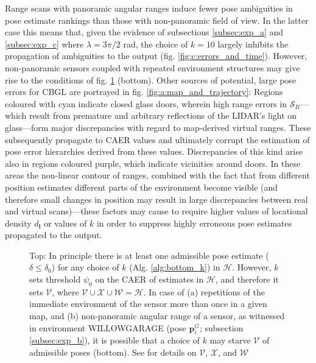 Range scans with panoramic angular ranges induce fewer pose ambiguities in pose
estimate rankings than those with non-panoramic field of view. In the latter
case this means that, given the evidence of subsections \ref{subsec:exp_a} and
\ref{subsec:exp_c} where $\lambda = 3\pi/2$ rad, the choice of $k=10$ largely
inhibits the propagation of ambiguities to the output (fig.
\ref{fig:c:errors_and_time}).  However, non-panoramic sensors coupled with
repeated environment structures may give rise to the conditions of fig.
\ref{fig:h_and_h_not_fig} (bottom). Other sources of potential, large pose
errors for CBGL are portrayed in fig. \ref{fig:a:map_and_trajectory}:
Regions coloured with cyan indicate closed glass doors, wherein high range
errors in $\mathcal{S}_R$---which result from premature and arbitrary
reflections of the LIDAR's light on glass---form major discrepancies with
regard to map-derived virtual ranges. These subsequently propagate to CAER
values and ultimately corrupt the estimation of pose error hierarchies derived
from these values.  Discrepancies of this kind arise also in regions coloured
purple, which indicate vicinities around doors. In these areas the non-linear
contour of ranges, combined with the fact that from different position
estimates different parts of the environment become visible (and therefore
small changes in position may result in large discrepancies between real and
virtual scans)---these factors may cause to require higher values of locational
density $d_{\bm{l}}$ or values of $k$ in order to suppress highly erroneous
pose estimates propagated to the output.

\begin{figure}[H]\vspace{-0.2cm}
  
  \vspace{0.3cm}
  \caption{\small Top: In principle there is at least one admissible pose
           estimate ($\delta \leq \delta_0$) for any choice of $k$ (Alg.
           \ref{alg:bottom_k}) in $\mathcal{H}$. However, $k$ sets threshold
           $\psi_0$ on the CAER of estimates in $\mathcal{H}$, and therefore it
           sets $\mathcal{V}$, where $\mathcal{V} \cup \mathcal{X} \cup
           \mathcal{W} = \mathcal{H}$. In case of (a) repetitions of the
           immediate environment of the sensor more than once in a given map,
           and (b) non-panoramic angular range of a sensor, as witnessed in
           environment WILLOWGARAGE (pose $\bm{p}_{i}^G$; subsection
           \ref{subsec:exp_b}), it is possible that a choice of $k$ may starve
           $\mathcal{V}$ of admissible poses (bottom). See \cite{cbglarxiv} for
           details on $\mathcal{V}$, $\mathcal{X}$, and $\mathcal{W}$
        }
  \label{fig:h_and_h_not_fig}
\end{figure}
